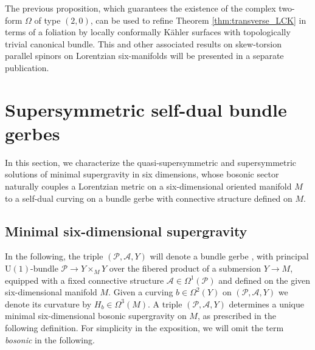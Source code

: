 \documentclass[10pt,a4paper,twoside,reqno]{amsart}
\theoremstyle{plain}
\theoremstyle{definition}
\theoremstyle{remark}
\def\U{\mathrm{U}}
\def\cA{\mathcal{A}}
\def\cP{\mathcal{P}}
\def\cP{\mathcal{P}}
\begin{document}
\noindent
The previous proposition, which guarantees the existence of the complex two-form $\Omega$ of type $(2,0)$, can be used to refine Theorem \ref{thm:transverse_LCK} in terms of a foliation by locally conformally Kähler surfaces with topologically trivial canonical bundle. This and other associated results on skew-torsion parallel spinors on Lorentzian six-manifolds will be presented in a separate publication.


\section{Supersymmetric self-dual bundle gerbes}
\label{sec:sugra6d}


In this section, we characterize the quasi-supersymmetric and supersymmetric solutions of minimal supergravity in six dimensions, whose bosonic sector naturally couples a Lorentzian metric on a six-dimensional oriented manifold $M$ to a self-dual curving on a bundle gerbe with connective structure defined on $M$.  


\subsection{Minimal six-dimensional supergravity}


In the following, the triple $(\cP,\cA,Y)$ will denote a bundle gerbe \cite{Murray1996}, with principal $\U(1)$-bundle $\cP\to Y \times_M Y$ over the fibered product of a submersion $Y\to M$, equipped with a fixed connective structure $\cA \in \Omega^1(\cP)$ and defined on the given six-dimensional manifold $M$. Given a curving $b\in \Omega^2(Y)$ on $(\cP,\cA,Y)$ we denote its curvature by $H_b\in \Omega^3(M)$.  A triple $(\cP,\cA,Y)$ determines a unique minimal six-dimensional bosonic supergravity on $M$, as prescribed in the following definition. For simplicity in the exposition, we will omit the term \emph{bosonic} in the following.
 
\end{document}
